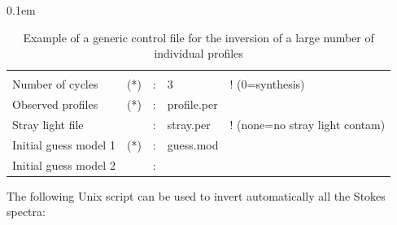 \begin{table}[t]
\small
\tabcolsep 0.1em
\caption{Example of a generic control file for the inversion of a large number
of individual profiles}
\label{multiple}
\begin{tabular}{lrcll}
 &  & &            &       \\
Number of cycles          &(*)&:&3             &! (0=synthesis)  \\
Observed profiles         &(*)&:&profile.per &             \\
Stray light file          &   &:&stray.per    & ! (none=no stray light contam)\\
Initial guess model 1     &(*)&:&guess.mod   &\\
Initial guess model 2     &   &:&           &\\
\end{tabular}
\end{table}


The following Unix script can be used to invert automatically
all the Stokes spectra:

